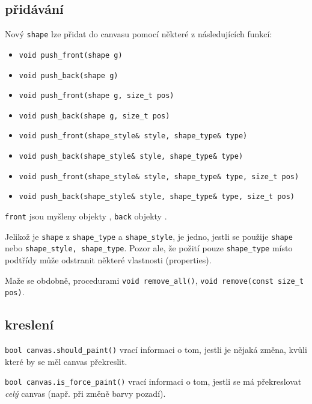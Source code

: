 \documentclass[11pt]{article} %
\begin{document}
\subsection{přidávání}

Nový \texttt{shape} lze přidat do canvasu pomocí některé z následujících funkcí:

\begin{itemize}
    \item \texttt{void push\_front(shape g)}
    \item \texttt{void push\_back(shape g)}
    
    \item \texttt{void push\_front(shape g, size\_t pos)}
    \item \texttt{void push\_back(shape g, size\_t pos)}
    
    \item \texttt{void push\_front(shape\_style\& style, shape\_type\& type)}
    \item \texttt{void push\_back(shape\_style\& style, shape\_type\& type)}
    
    \item \texttt{void push\_front(shape\_style\& style, shape\_type\& type, size\_t pos)}
    \item \texttt{void push\_back(shape\_style\& style, shape\_type\& type, size\_t pos)}
    
\end{itemize}

\texttt{front} jsou myšleny objekty , \texttt{back} objekty .

Jelikož je \texttt{shape}  z \texttt{shape\_type} a \texttt{shape\_style}, je jedno, jestli se použije \texttt{shape} nebo \texttt{shape\_style, shape\_type}. Pozor ale, že požití pouze \texttt{shape\_type} místo podtřídy může odstranit některé vlastnosti (properties).


Maže se obdobně, procedurami \texttt{void remove\_all()}, \texttt{void remove(const size\_t pos)}.

\subsection{kreslení}
\texttt{bool canvas.should\_paint()} vrací informaci o tom, jestli je nějaká změna, kvůli které by se měl canvas překreslit.

\texttt{bool canvas.is\_force\_paint()} vrací informaci o tom, jestli se má překreslovat \emph{celý} canvas (např. při změně barvy pozadí).
\end{document}
